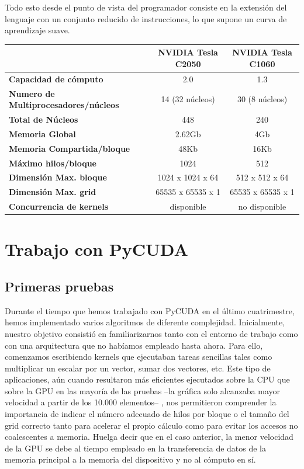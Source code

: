 \documentclass[twoside]{article}
\begin{document}
Todo esto desde el punto de vista del programador consiste en la extensión del lenguaje con un conjunto reducido de instrucciones, lo que supone un curva de aprendizaje suave.

\begin{center}
   \begin{tabular}{ | l | c | c | }
      \hline
      & \textbf{NVIDIA Tesla C2050} & \textbf{NVIDIA Tesla C1060} \\ \hline
      \textbf{Capacidad de cómputo} & 2.0 & 1.3 \\ \hline
      \textbf{Numero de Multiprocesadores/núcleos} & 14 (32 núcleos) & 30 (8 núcleos) \\ \hline
      \textbf{Total de Núcleos} & 448 & 240 \\ \hline
      \textbf{Memoria Global} & 2.62Gb & 4Gb \\ \hline
      \textbf{Memoria Compartida/bloque} & 48Kb & 16Kb \\ \hline
      \textbf{Máximo hilos/bloque} & 1024 & 512 \\ \hline
      \textbf{Dimensión Max. bloque} & 1024 x 1024 x 64 & 512 x 512 x 64 \\ \hline
      \textbf{Dimensión Max. grid} & 65535 x 65535 x 1 & 65535 x 65535 x 1 \\ \hline
      \textbf{Concurrencia de kernels} & disponible & no disponible \\
   \hline
   \end{tabular}
\end{center}

\section{Trabajo con PyCUDA}

\subsection{Primeras pruebas}

Durante el tiempo que hemos trabajado con PyCUDA en el último cuatrimestre, hemos implementado varios algoritmos de diferente complejidad. Inicialmente, nuestro objetivo consistió en familiarizarnos tanto con el entorno de trabajo como con una arquitectura que no habíamos empleado hasta ahora. Para ello, comenzamos escribiendo kernels que ejecutaban tareas sencillas tales como multiplicar un escalar por un vector, sumar dos vectores, etc. Este tipo de aplicaciones, aún cuando resultaron más eficientes ejecutados sobre la CPU que sobre la GPU en las mayoría de las pruebas --la gráfica solo alcanzaba mayor velocidad a partir de los 10.000 elementos-- , nos permitieron comprender la importancia de indicar el número adecuado de hilos por bloque o el tamaño del grid correcto tanto para acelerar el propio cálculo como para evitar los accesos no coalescentes a memoria. Huelga decir que en el caso anterior, la menor velocidad de la GPU se debe al tiempo empleado en la transferencia de datos de la memoria principal a la memoria del dispositivo y no al cómputo en sí.
\end{document}

